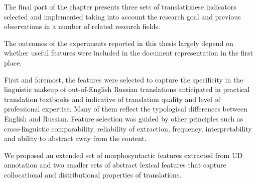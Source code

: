 The final part of the chapter presents three sets of translationese indicators selected and implemented taking into account the research goal and previous observations in a number of related research fields.  

The outcomes of the experiments reported in this thesis largely depend on whether useful features were included in the document representation in the first place. 

First and foremost, the features were selected to capture the specificity in the linguistic makeup of out-of-English Russian translations anticipated in practical translation textbooks and indicative of translation quality and level of professional expertise. Many of them reflect the typological differences between English and Russian. Feature selection was guided by other principles such as cross-linguistic comparability, reliability of extraction, frequency, interpretability and ability to abstract away from the content.

We proposed an extended set of morphosyntactic features extracted from UD annotation and two smaller sets of abstract lexical features that capture collocational and distributional properties of translations. 

